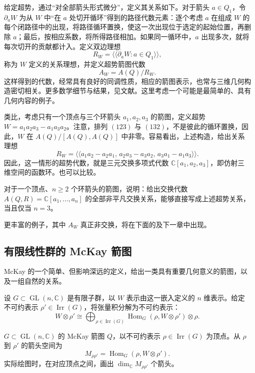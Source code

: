 给定超势，通过“对全部箭头形式微分”，定义其关系如下。对于箭头 $a\in Q_1$，令 $\partial_aW$ 为从 $W$ 中“在 $a$ 处切开循环”得到的路径代数元素：逐个考虑 $a$ 在组成 $W$ 的每个闭路径中的出现，将路径循环置换，使这一次出现位于选定的起始位置，再删除 $a$；最后，按相应系数，将所得路径相加。如果同一循环中，$a$ 出现多次，就将每次切开的贡献都计入。定义双边理想
\[
R_W=\langle\!\langle\partial_aW:a\in Q_1\rangle\!\rangle,
\]
称为 $W$ 定义的关系理想，并定义超势箭图代数
\[
A_W=A(Q)/R_W.
\]
这样得到的代数，经常具有良好的同调性质，相应的箭图表示，也常与三维几何构造密切相关。更多数学细节与结果，见文献。这里考虑一个可能是最简单的、具有几何内容的例子。

\begin{example}\label{ex:4.33}
类比，考虑只有一个顶点与三个环箭头 $a_1,a_2,a_3$ 的箭图，定义超势 $W=a_1a_2a_3-a_1a_3a_2$。注意，排列 $(123)$ 与 $(132)$，不是彼此的循环置换，因此，$W$ 在 $A(Q)/[A(Q),A(Q)]$ 中非零。容易看出，上述构造，给出关系理想
\[
R_W=\langle\!\langle a_1a_2-a_2a_1,\,
a_2a_3-a_3a_2,\,a_3a_1-a_1a_3\rangle\!\rangle.
\]
因此，这一情形的超势代数，就是三元交换多项式代数 $\mathbb{C}[a_1,a_2,a_3]$，即仿射三维空间的函数环。也可以比较。
\end{example}

\begin{exercise*}
对于一个顶点、$n\ge2$ 个环箭头的箭图，说明：给出交换代数 $A(Q,R)=\mathbb{C}[a_1,\ldots,a_n]$ 的全部非平凡交换关系，能够直接写成上述超势关系，当且仅当 $n=3$。
\end{exercise*}

更丰富的例子，其中 $A_W$ 真正非交换，将在下面的及下一章中出现。

\subsection{有限线性群的 McKay 箭图}\label{sec:4.2.6}

McKay 的一个简单、但影响深远的定义，给出一类具有重要几何意义的箭图，以及一组自然的关系。

设 $G\subset\operatorname{GL}(n,\mathbb{C})$ 是有限子群，以 $W$ 表示由这一嵌入定义的 $n$ 维表示。给定不可约表示 $\rho'\in\operatorname{Irr}(G)$，将张量积分解为不可约表示：
\begin{equation}\label{eq:4.1}
W\otimes\rho'
\cong\bigoplus_{\rho\in\operatorname{Irr}(G)}
\operatorname{Hom}_G(\rho,W\otimes\rho')\otimes\rho.
\end{equation}
\begin{definition*}\label{def:4.mckay-quiver}
$G\subset\operatorname{GL}(n,\mathbb{C})$ 的 McKay 箭图 $Q$，以不可约表示 $\rho\in\operatorname{Irr}(G)$ 为顶点。从 $\rho$ 到 $\rho'$ 的箭头空间为
\[
M_{\rho\rho'}=\operatorname{Hom}_G(\rho,W\otimes\rho').
\]
实际绘图时，在对应顶点之间，画出 $\dim_{\mathbb{C}}M_{\rho\rho'}$ 个箭头。
\end{definition*}

